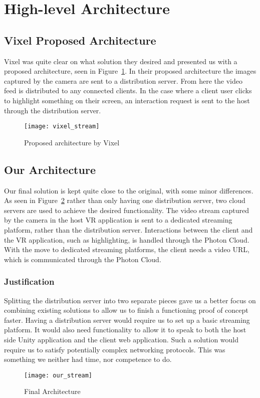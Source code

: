 \section{High-level Architecture}
\subsection{Vixel Proposed Architecture}
Vixel was quite clear on what solution they desired and presented us with a proposed architecture, seen in Figure~\ref{fig:proposed_architecture}. In their proposed architecture the images captured by the camera are sent to a distribution server. From here the video feed is distributed to any connected clients.
In the case where a client user clicks to highlight something on their screen, an interaction request is sent to the host through the distribution server.

\begin{figure}
    \centering
    \texttt{[image: vixel\_stream]}
    \caption{Proposed architecture by Vixel}
    \label{fig:proposed_architecture}
\end{figure}

\subsection{Our Architecture}
Our final solution is kept quite close to the original, with some minor differences. As seen in Figure~\ref{fig:our_architecture} rather than only having one distribution server, two cloud servers are used to achieve the desired functionality. The video stream captured by the camera in the host VR application is sent to a dedicated streaming platform, rather than the distribution server. Interactions between the client and the VR application, such as highlighting, is handled through the Photon Cloud. With the move to dedicated streaming platforms, the client needs a video URL, which is communicated through the Photon Cloud.

\subsubsection{Justification}
Splitting the distribution server into two separate pieces gave us a better focus on combining existing solutions to allow us to finish a functioning proof of concept faster. Having a distribution server would require us to set up a basic streaming platform. It would also need functionality to allow it to speak to both the host side Unity application and the client web application. Such a solution would require us to satisfy potentially complex networking protocols. This was something we neither had time, nor competence to do.

\begin{figure}
    \centering
    \texttt{[image: our\_stream]}
    \caption{Final Architecture}
    \label{fig:our_architecture}
\end{figure}